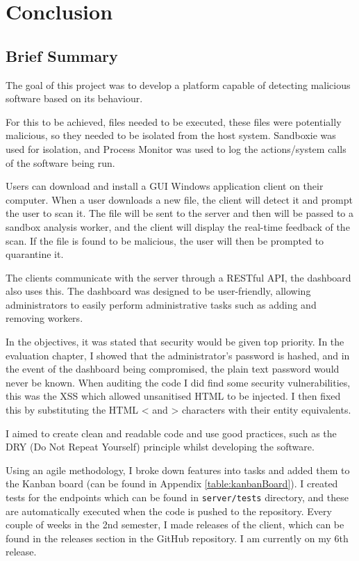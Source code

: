 \chapter{Conclusion}

\section{Brief Summary}
The goal of this project was to develop a platform capable
of detecting malicious software based on its behaviour.

For this to be achieved, files needed to be executed,
these files were potentially malicious,
so they needed to be isolated from the host system.
Sandboxie was used for isolation,
and Process Monitor was used to log
the actions/system calls of the software being run.

Users can download and install a GUI Windows application client on their computer.
When a user downloads a new file, the client will detect it and prompt the user to scan it.
The file will be sent to the server and then will be passed to a sandbox analysis worker,
and the client will display the real-time feedback of the scan.
If the file is found to be malicious, the user will then be prompted to quarantine it.

The clients communicate with the server through a RESTful API,
the dashboard also uses this.
The dashboard was designed to be user-friendly,
allowing administrators to easily perform administrative tasks
such as adding and removing workers.

In the objectives, it was stated that security would be given top priority.
In the evaluation chapter, I showed that the administrator's password is hashed,
and in the event of the dashboard being compromised,
the plain text password would never be known.
When auditing the code I did find some security vulnerabilities,
this was the XSS which allowed unsanitised HTML to be injected.
I then fixed this by substituting the HTML < and >
characters with their entity equivalents.

I aimed to create clean and readable code and use good practices,
such as the DRY (Do Not Repeat Yourself)
principle whilst developing the software.

Using an agile methodology,
I broke down features into tasks and added them to the Kanban board
(can be found in Appendix \ref{table:kanbanBoard}).
I created tests for the endpoints which can be found in \texttt{server/tests} directory,
and these are automatically executed when the code is pushed to the repository.
Every couple of weeks in the 2nd semester, I made releases of the client,
which can be found in the releases section in the GitHub repository.
I am currently on my 6th release.

